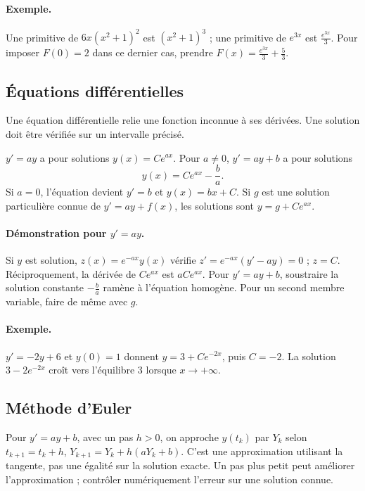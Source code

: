 \paragraph{Exemple.} Une primitive de $6x(x^2+1)^2$ est $(x^2+1)^3$ ; une primitive de $e^{3x}$ est $\frac{e^{3x}}{3}$. Pour imposer $F(0)=2$ dans ce dernier cas, prendre $F(x)=\frac{e^{3x}}{3}+\frac{5}{3}$.
\subsection{Équations différentielles}
Une équation différentielle relie une fonction inconnue à ses dérivées. Une solution doit être vérifiée sur un intervalle précisé.
\begin{keypoint}
$y'=ay$ a pour solutions $y(x)=Ce^{ax}$. Pour $a\ne0$, $y'=ay+b$ a pour solutions
\[y(x)=Ce^{ax}-\frac ba.\]
Si $a=0$, l'équation devient $y'=b$ et $y(x)=bx+C$.
Si $g$ est une solution particulière connue de $y'=ay+f(x)$, les solutions sont $y=g+Ce^{ax}$.
\end{keypoint}
\paragraph{Démonstration pour $y'=ay$.} Si $y$ est solution, $z(x)=e^{-ax}y(x)$ vérifie $z'=e^{-ax}(y'-ay)=0$ ; $z=C$. Réciproquement, la dérivée de $Ce^{ax}$ est $aCe^{ax}$. Pour $y'=ay+b$, soustraire la solution constante $-\frac{b}{a}$ ramène à l'équation homogène. Pour un second membre variable, faire de même avec $g$.
\paragraph{Exemple.} $y'=-2y+6$ et $y(0)=1$ donnent $y=3+Ce^{-2x}$, puis $C=-2$. La solution $3-2e^{-2x}$ croît vers l'équilibre $3$ lorsque $x\to+\infty$.
\subsection{Méthode d'Euler}
Pour $y'=ay+b$, avec un pas $h>0$, on approche $y(t_k)$ par $Y_k$ selon $t_{k+1}=t_k+h$, $Y_{k+1}=Y_k+h(aY_k+b)$. C'est une approximation utilisant la tangente, pas une égalité sur la solution exacte. Un pas plus petit peut améliorer l'approximation ; contrôler numériquement l'erreur sur une solution connue.


\mxnewpage
